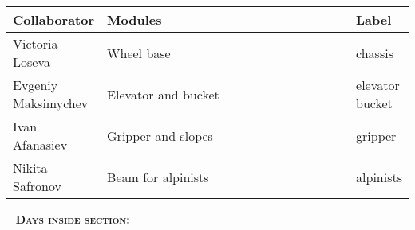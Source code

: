 	\begin{table}[H]
		\vspace{-2mm}
		\begin{center}
			\begin{tabular}{|p{0.2\linewidth}|p{0.7\linewidth}|p{0.1\linewidth}|}
				\hline
				Collaborator & Modules & Label \\
				\hline
				Victoria Loseva & Wheel base & chassis \\
				\hline
				Evgeniy Maksimychev & Elevator and bucket & elevator bucket \\
				\hline
				Ivan Afanasiev & Gripper and slopes & gripper \\
				\hline
				Nikita Safronov & Beam for alpinists & alpinists \\
				\hline
			\end{tabular}
		\end{center}
	\end{table}
  
   \newline
  \textsc{\textbf{Days inside section:}}
  
  
  
  
  
